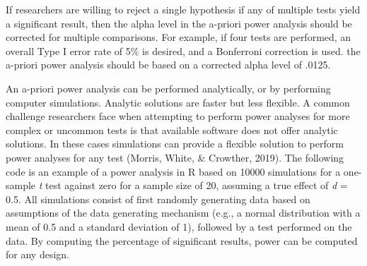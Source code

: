 \documentclass[
  english,
  ,jou, a4paper,floatsintext]{apa6}
\newenvironment{Shaded}{\begin{snugshade}}{\end{snugshade}}
\newcommand{\ControlFlowTok}[1]{\textcolor[rgb]{0.13,0.29,0.53}{\textbf{#1}}}
\newcommand{\DataTypeTok}[1]{\textcolor[rgb]{0.13,0.29,0.53}{#1}}
\newcommand{\DecValTok}[1]{\textcolor[rgb]{0.00,0.00,0.81}{#1}}
\newcommand{\FloatTok}[1]{\textcolor[rgb]{0.00,0.00,0.81}{#1}}
\newcommand{\KeywordTok}[1]{\textcolor[rgb]{0.13,0.29,0.53}{\textbf{#1}}}
\newcommand{\NormalTok}[1]{#1}
\newcommand{\OperatorTok}[1]{\textcolor[rgb]{0.81,0.36,0.00}{\textbf{#1}}}
\newcommand{\StringTok}[1]{\textcolor[rgb]{0.31,0.60,0.02}{#1}}
\begin{document}
If researchers are willing to reject a single hypothesis if any of multiple tests yield a significant result, then the alpha level in the a-priori power analysis should be corrected for multiple comparisons. For example, if four tests are performed, an overall Type I error rate of 5\% is desired, and a Bonferroni correction is used. the a-priori power analysis should be based on a corrected alpha level of .0125.

An a-priori power analysis can be performed analytically, or by performing computer simulations. Analytic solutions are faster but less flexible. A common challenge researchers face when attempting to perform power analyses for more complex or uncommon tests is that available software does not offer analytic solutions. In these cases simulations can provide a flexible solution to perform power analyses for any test (Morris, White, \& Crowther, 2019). The following code is an example of a power analysis in R based on 10000 simulations for a one-sample \emph{t} test against zero for a sample size of 20, assuming a true effect of \emph{d} = 0.5. All simulations consist of first randomly generating data based on assumptions of the data generating mechanism (e.g., a normal distribution with a mean of 0.5 and a standard deviation of 1), followed by a test performed on the data. By computing the percentage of significant results, power can be computed for any design.

\begin{Shaded}
\end{Shaded}
\end{document}
